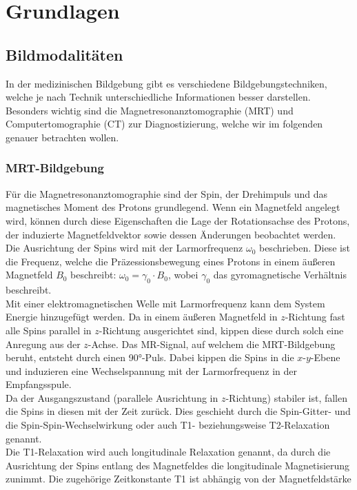 \section{Grundlagen}
\subsection{Bildmodalitäten}
In der medizinischen Bildgebung gibt es verschiedene Bildgebungstechniken,
welche je nach Technik unterschiedliche Informationen besser darstellen.
Besonders wichtig sind die Magnetresonanztomographie (MRT) und
Computertomographie (CT) zur Diagnostizierung, welche wir im folgenden genauer
betrachten wollen.

\subsubsection{MRT-Bildgebung}
Für die Magnetresonanztomographie sind der Spin, der Drehimpuls und das
magnetisches Moment des Protons grundlegend. Wenn ein Magnetfeld angelegt wird,
können durch diese Eigenschaften die Lage der Rotationsachse des Protons, der
induzierte Magnetfeldvektor sowie dessen Änderungen beobachtet werden.\\
Die Ausrichtung der Spins wird mit der Larmorfrequenz $\omega_0$ beschrieben.
Diese ist die Frequenz, welche die Präzessionsbewegung eines Protons in einem
äußeren Magnetfeld $B_0$ beschreibt: $\omega_0 = \gamma_0 \cdot B_0$, wobei
$\gamma_0$ das gyromagnetische Verhältnis beschreibt.\\
Mit einer elektromagnetischen Welle mit Larmorfrequenz kann dem System Energie
hinzugefügt werden. Da in einem äußeren Magnetfeld in $z$-Richtung fast alle
Spins parallel in $z$-Richtung ausgerichtet sind, kippen diese durch solch eine
Anregung aus der $z$-Achse. Das MR-Signal, auf welchem die MRT-Bildgebung
beruht, entsteht durch einen \ang{90}-Puls. Dabei kippen die Spins in die
$x$-$y$-Ebene und induzieren eine Wechselspannung mit der Larmorfrequenz in der
Empfangsspule.\\
Da der Ausgangszustand (parallele Ausrichtung in $z$-Richtung) stabiler ist,
fallen die Spins in diesen mit der Zeit zurück. Dies geschieht durch die
Spin-Gitter- und die Spin-Spin-Wechselwirkung oder auch T1- beziehungsweise
T2-Relaxation genannt.\\
Die T1-Relaxation wird auch longitudinale Relaxation genannt, da durch die
Ausrichtung der Spins entlang des Magnetfeldes die longitudinale Magnetisierung
zunimmt. Die zugehörige Zeitkonstante T1 ist abhängig von der Magnetfeldstärke
